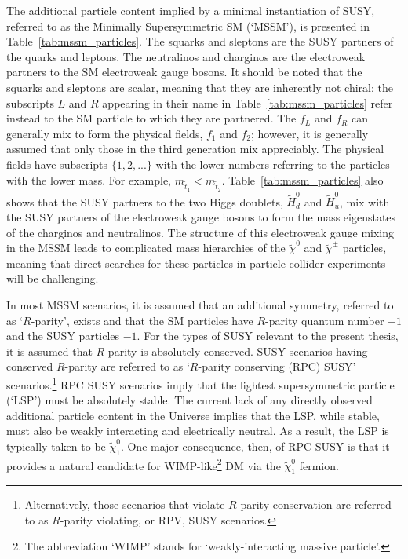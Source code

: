The additional particle content implied by a minimal instantiation of SUSY, referred
to as the Minimally Supersymmetric SM (`MSSM'), is presented in Table~\ref{tab:mssm_particles}.
The squarks and sleptons are the SUSY partners of the quarks and leptons.
The neutralinos and charginos are the electroweak partners to the SM electroweak gauge bosons.
It should be noted that the squarks and sleptons are scalar, meaning that they are inherently not chiral:
the subscripts $L$ and $R$ appearing in their name in Table~\ref{tab:mssm_particles} refer instead to the SM particle to which they are partnered.
The $f_L$ and $f_R$ can generally mix to form the physical fields, $f_1$ and $f_2$; however, it is generally assumed
that only those in the third generation mix appreciably.
The physical fields have subscripts $\{1,2,...\}$ with the lower numbers referring to the particles
with the lower mass.
For example, $m_{\tilde{t}_1} < m_{\tilde{t}_2}$.
Table~\ref{tab:mssm_particles} also shows that the SUSY partners to the two Higgs doublets, $\tilde{H}^0_d$ and $\tilde{H}^{0}_u$, mix with the
SUSY partners of the electroweak gauge bosons to form the mass eigenstates of the charginos and neutralinos.
The structure of this electroweak gauge mixing in the MSSM
leads to complicated mass hierarchies of the $\tilde{\chi}^0$ and $\tilde{\chi}^{\pm}$ particles, meaning that direct searches
for these particles in particle collider experiments will be challenging.

In most MSSM scenarios, it is assumed that an additional symmetry, referred to as `$R$-parity', exists
and that the SM particles have $R$-parity quantum number $+1$ and the SUSY particles $-1$.
For the types of SUSY relevant to the present thesis, it is assumed that $R$-parity is absolutely conserved.
SUSY scenarios having conserved $R$-parity are referred to as `$R$-parity conserving (RPC) SUSY' scenarios.\footnote{
Alternatively, those scenarios that violate $R$-parity conservation are referred to as $R$-parity violating, or RPV, SUSY scenarios.
}
RPC SUSY scenarios imply that the lightest supersymmetric particle (`LSP') must be absolutely stable.
The current lack of any directly observed additional particle content in the Universe implies that the LSP, while stable,
must also be weakly interacting and electrically neutral.
As a result, the LSP is typically taken to be $\tilde{\chi}^0_1$.
One major consequence, then, of RPC SUSY is that it provides a natural candidate for WIMP-like\footnote{
The abbreviation `WIMP' stands for `weakly-interacting massive particle'.
} DM via the $\tilde{\chi}^0_1$ fermion.

